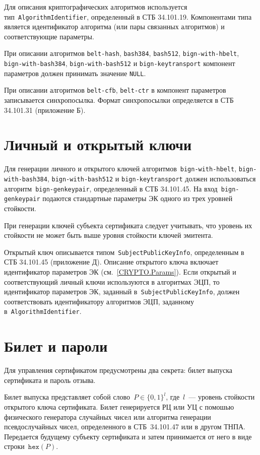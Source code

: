 Для описания криптографических алгоритмов используется 
тип~\texttt{AlgorithmIdentifier}, определенный в СТБ 34.101.19.
Компонентами типа является идентификатор алгоритма (или пары 
связанных алгоритмов) и соответствующие параметры. 

При описании алгоритмов 
\texttt{belt-hash}, \texttt{bash384}, \texttt{bash512},
\texttt{bign-with-hbelt}, \texttt{bign-with-bash384}, 
\texttt{bign-with-bash512} и \texttt{bign-keytransport} компонент параметров 
должен принимать значение \texttt{NULL}.

При описании алгоритмов \texttt{belt-cfb}, \texttt{belt-ctr}
в компонент параметров записывается синхропосылка.
Формат синхропосылки определяется в СТБ 34.101.31 (приложение Б).

\section{Личный и открытый ключи}\label{CRYPTO.Keypair}

Для генерации личного и открытого ключей алгоритмов~\texttt{bign-with-hbelt}, 
\texttt{bign-with-bash384}, \texttt{bign-with-bash512} и 
\texttt{bign-keytransport} должен использоваться 
алгоритм~\texttt{bign-genkeypair}, определенный в СТБ 34.101.45. 
%
На вход~\texttt{bign-genkeypair} подаются стандартные параметры ЭК одного 
из трех уровней стойкости. 

При генерации ключей субъекта сертификата следует учитывать, что 
уровень их стойкости не может быть выше уровня стойкости ключей эмитента.

Открытый ключ описывается типом~\texttt{SubjectPublicKeyInfo}, 
определенным в СТБ 34.101.45 (приложение Д).
%
Описание открытого ключа включает идентификатор параметров ЭК 
(см.~\ref{CRYPTO.Params}). 
%
Если открытый и соответствующий личный ключи используются в алгоритмах 
ЭЦП, то идентификатор параметров ЭК, заданный в~\texttt{SubjectPublicKeyInfo},
должен соответствовать идентификатору алгоритмов ЭЦП, заданному 
в~\texttt{AlgorithmIdentifier}.

\section{Билет и пароли}\label{CRYPTO.Pwd}

Для управления сертификатом предусмотрены два секрета:
билет выпуска сертификата и пароль отзыва. 

Билет выпуска представляет собой слово~$P\in\{0,1\}^l$,
где~$l$~--- уровень стойкости открытого ключа сертификата.
%
Билет генерируется РЦ или УЦ с помошью физического генератора 
случайных чисел или алгоритма генерации псевдослучайных чисел, 
определенного в СТБ~34.101.47 или в другом ТНПА. 
%
Передается будущему субъекту сертификата и затем принимается от него
в виде строки~$\texttt{hex}(P)$. 

